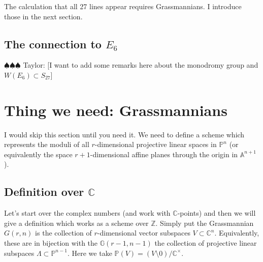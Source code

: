 \documentclass[12pt]{article}
\numberwithin{equation}{section}
\theoremstyle{definition}
\theoremstyle{remark}
\newcommand{\CC}{\mathbb{C}}
\newcommand{\ZZ}{\mathbb{Z}}
\newcommand{\PP}{\mathbb{P}}
\renewcommand{\AA}{\mathbb{A}}
\newcommand{\GG}{\mathbb{G}}
\newcommand{\taylor}[1]{{\color{blue} \sf $\spadesuit\spadesuit\spadesuit$ Taylor: [#1]}}
\begin{document}
The calculation that all 27 lines appear requires Grassmannians.
I introduce those in the next section.

\subsection{The connection to $E_6$}

\taylor{I want to add some remarks here about the monodromy group and $W(E_6) \subset S_{27}$}



\section{Thing we need: Grassmannians}
I would skip this section until you need it. 
We need to define a scheme which represents the moduli of all $r$-dimensional projective linear spaces  in $\PP^n$ (or equivalently the space $r+1$-dimensional affine planes through the origin in $\AA^{n+1}$).
\subsection{Definition over $\CC$}
Let's start over the complex numbers (and work with $\CC$-points) and then we will give a definition which works as a scheme over $\ZZ$. 
Simply put the Grassmannian $G(r,n)$ is the collection of $r$-dimensional vector subspaces $V \subset \CC^n$. 
Equivalently, these are in bijection with the $\GG(r-1,n-1)$ the collection of projective linear subspaces $\Lambda \subset \PP^{n-1}$. 
Here we take $\PP(V) = (V\setminus 0)/\CC^{\times}$.
\end{document}
